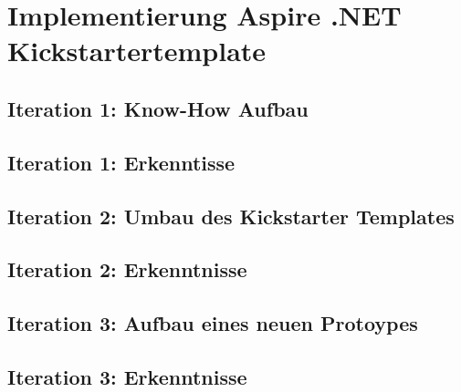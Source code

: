 \section{Implementierung Aspire .NET Kickstartertemplate}
\subsection{Iteration 1: Know-How Aufbau}

\subsection{Iteration 1: Erkenntisse}

\subsection{Iteration 2: Umbau des Kickstarter Templates}

\subsection{Iteration 2: Erkenntnisse}

\subsection{Iteration 3: Aufbau eines neuen Protoypes}

\subsection{Iteration 3: Erkenntnisse}



